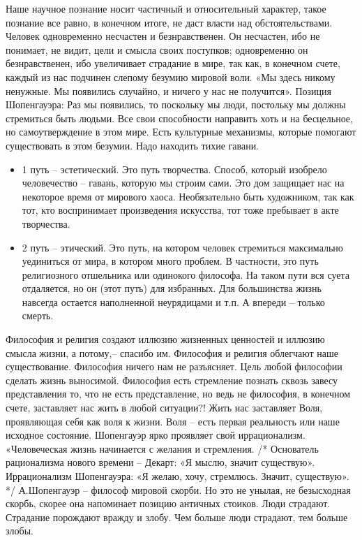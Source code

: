 \documentclass[12pt]{article}
\begin{document}
Наше научное познание носит частичный и относительный характер, такое познание все равно, в конечном
итоге, не даст власти над обстоятельствами. Человек одновременно несчастен и безнравственен. Он несчастен,
ибо не понимает, не видит, цели и смысла своих поступков; одновременно он безнравственен, ибо увеличивает
страдание в мире, так как, в конечном счете, каждый из нас подчинен слепому безумию мировой воли.
«Мы здесь никому ненужные. Мы появились случайно, и ничего у нас не получится».
Позиция Шопенгауэра: Раз мы появились, то поскольку мы люди, постольку мы должны стремиться быть
людьми. Все свои способности направить хоть и на бесцельное, но самоутверждение в этом мире. Есть
культурные механизмы, которые помогают существовать в этом безумии. Надо находить тихие гавани.
\begin{itemize}
\item 1 путь – эстетический. Это путь творчества. Способ, который изобрело человечество – гавань, которую мы 
строим сами. Это дом защищает нас на некоторое время от мирового хаоса. Необязательно быть художником,
так как тот, кто воспринимает произведения искусства, тот тоже пребывает в акте творчества.
\item 2 путь – этический. Это путь, на котором человек стремиться максимально уединиться от мира, в котором много
проблем. В частности, это путь религиозного отшельника или одинокого философа. На таком пути вся суета
отдаляется, но он (этот путь) для избранных. Для большинства жизнь навсегда остается наполненной
неурядицами и т.п. А впереди – только смерть.
\end{itemize}
Философия и религия создают иллюзию жизненных ценностей и иллюзию смысла жизни, а потому,– спасибо
им. Философия и религия облегчают наше существование.
Философия ничего нам не разъясняет. Цель любой философии сделать жизнь выносимой. Философия есть
стремление познать сквозь завесу представления то, что не есть представление, но ведь не философия, в
конечном счете, заставляет нас жить в любой ситуации?! Жить нас заставляет Воля, проявляющая себя как воля
к жизни. 
Воля – есть первая реальность или наше исходное состояние.
Шопенгауэр ярко проявляет свой иррационализм. «Человеческая жизнь начинается с желания и стремления. /*
Основатель рационализма нового времени – Декарт: «Я мыслю, значит существую». Иррационализм
Шопенгауэра: «Я желаю, хочу, стремлюсь. Значит, существую». */
А.Шопенгауэр – философ мировой скорби. Но это не унылая, не безысходная скорбь, скорее она напоминает
позицию античных стоиков.
Люди страдают. Страдание порождают вражду и злобу. Чем больше люди страдают, тем больше злобы.
\end{document}
